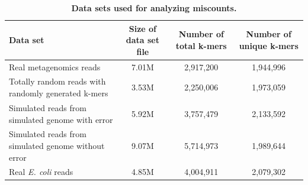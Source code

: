 \documentclass[10pt]{article}
\begin{document}


% 


\begin{table}[!ht]
\caption{
\bf{Data sets used for analyzing miscounts.}}
\begin{tabular}{ | p{5cm} | c | c | c |}
\hline
Data set & Size of data set file & Number of total k-mers & Number of unique k-mers \\
\hline
Real metagenomics reads                                  & 7.01M  & 2,917,200  & 1,944,996 \\
\hline
Totally random reads with randomly generated k-mers      & 3.53M  & 2,250,006  & 1,973,059 \\
\hline
Simulated reads from simulated genome with error         & 5.92M  & 3,757,479  & 2,133,592 \\
\hline
Simulated reads from simulated genome without error      & 9.07M  & 5,714,973  & 1,989,644 \\
\hline
Real {\em E. coli} reads                                        & 4.85M  & 4,004,911  & 2,079,302 \\
\end{tabular}
\begin{flushleft}
\end{flushleft}
\label{table:random_data}
\end{table}



\end{document}
